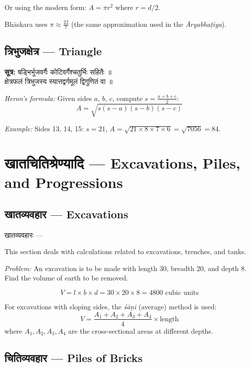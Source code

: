\documentclass[10pt,a4paper]{article}
\newenvironment{sanskritverse}{%
  \begin{center}%
  \begin{minipage}{0.94\textwidth}%
  \centering\devanagarifont\small%
}{%
  \end{minipage}%
  \end{center}%
  \vspace{0.1em}%
}
\begin{document}
Or using the modern form: $A = \pi r^2$ where $r = d/2$.

Bhāskara uses $\pi \approx \frac{22}{7}$ (the same approximation used in the \textit{Āryabhaṭīya}).

\subsection{त्रिभुजक्षेत्र — Triangle}

\begin{sanskritverse}
\textbf{सूत्र:} षड्भिर्भुजवर्गैः कोटिवर्गैश्चतुर्भिः सहितैः ॥\\
क्षेत्रफलं त्रिभुजस्य स्यात्तद्वर्गमूलं द्विगुणितं वा ॥
\end{sanskritverse}

\textit{Heron's formula:} Given sides $a$, $b$, $c$, compute $s = \frac{a+b+c}{2}$:
\[
A = \sqrt{s(s-a)(s-b)(s-c)}
\]

\textit{Example:} Sides 13, 14, 15: $s = 21$, $A = \sqrt{21 \times 8 \times 7 \times 6} = \sqrt{7056} = 84$.

\section{खातचितिश्रेण्यादि — Excavations, Piles, and Progressions}
\label{sec:khata}

\subsection{खातव्यवहार — Excavations}

\begin{sanskritverse}
खातव्यवहारः ---
\end{sanskritverse}

This section deals with calculations related to excavations, trenches, and tanks.

\textit{Problem:} An excavation is to be made with length 30, breadth 20, and depth 8. Find the volume of earth to be removed.

\[
V = l \times b \times d = 30 \times 20 \times 8 = 4800 \text{ cubic units}
\]

For excavations with sloping sides, the \textit{śāṇi} (average) method is used:
\[
V = \frac{A_1 + A_2 + A_3 + A_4}{4} \times \text{length}
\]
where $A_1, A_2, A_3, A_4$ are the cross-sectional areas at different depths.

\subsection{चितिव्यवहार — Piles of Bricks}
\end{document}
